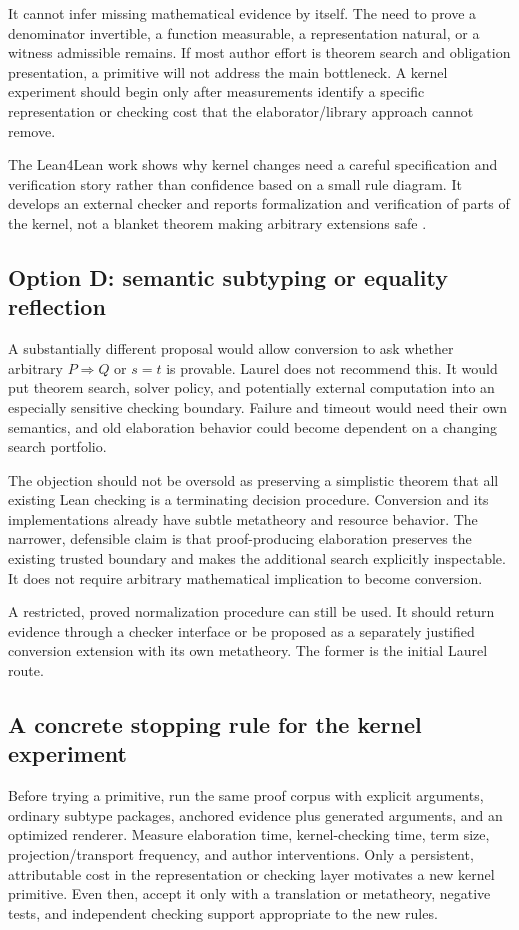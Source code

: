 \documentclass[11pt,a4paper]{article}
\theoremstyle{definition}
\theoremstyle{remark}
\begin{document}
It cannot infer missing mathematical evidence by itself. The need to prove a denominator invertible, a function measurable, a representation natural, or a witness admissible remains. If most author effort is theorem search and obligation presentation, a primitive will not address the main bottleneck. A kernel experiment should begin only after measurements identify a specific representation or checking cost that the elaborator/library approach cannot remove.

The Lean4Lean work shows why kernel changes need a careful specification and verification story rather than confidence based on a small rule diagram. It develops an external checker and reports formalization and verification of parts of the kernel, not a blanket theorem making arbitrary extensions safe \cite{lean4lean}.

\subsection{Option D: semantic subtyping or equality reflection}
A substantially different proposal would allow conversion to ask whether arbitrary $P\Rightarrow Q$ or $s=t$ is provable. Laurel does not recommend this. It would put theorem search, solver policy, and potentially external computation into an especially sensitive checking boundary. Failure and timeout would need their own semantics, and old elaboration behavior could become dependent on a changing search portfolio.

The objection should not be oversold as preserving a simplistic theorem that all existing Lean checking is a terminating decision procedure. Conversion and its implementations already have subtle metatheory and resource behavior. The narrower, defensible claim is that proof-producing elaboration preserves the existing trusted boundary and makes the additional search explicitly inspectable. It does not require arbitrary mathematical implication to become conversion.

A restricted, proved normalization procedure can still be used. It should return evidence through a checker interface or be proposed as a separately justified conversion extension with its own metatheory. The former is the initial Laurel route.

\subsection{A concrete stopping rule for the kernel experiment}
Before trying a primitive, run the same proof corpus with explicit arguments, ordinary subtype packages, anchored evidence plus generated arguments, and an optimized renderer. Measure elaboration time, kernel-checking time, term size, projection/transport frequency, and author interventions. Only a persistent, attributable cost in the representation or checking layer motivates a new kernel primitive. Even then, accept it only with a translation or metatheory, negative tests, and independent checking support appropriate to the new rules.
\end{document}
